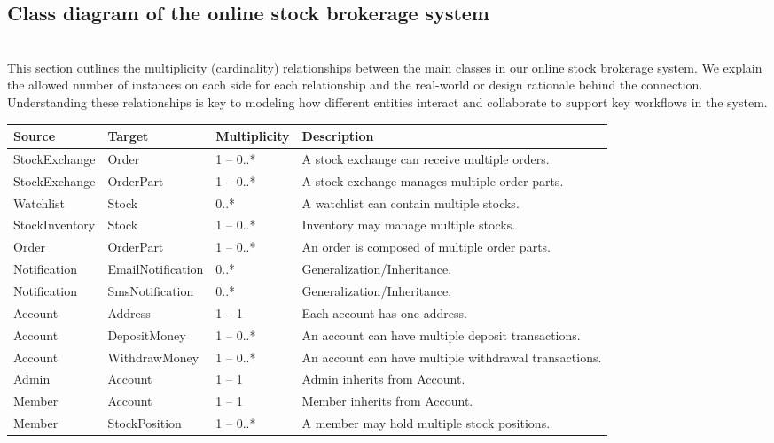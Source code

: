 \subsection{Class diagram of the online stock brokerage system}\label{bJQQQJ-QQApU6H2WxM6xd}
\\
This section outlines the multiplicity (cardinality) relationships between the main classes in our online stock brokerage system. We explain the allowed number of instances on each side for each relationship and the real-world or design rationale behind the connection. Understanding these relationships is key to modeling how different entities interact and collaborate to support key workflows in the system.

\begin{table}[h!]
\centering
\begin{tabularx}{\textwidth}{|X|X|X|X|}
\hline
\textbf{Source} & \textbf{Target} & \textbf{Multiplicity} & \textbf{Description} \\
\hline
StockExchange & Order & 1 – 0..* & A stock exchange can receive multiple orders. \\
\hline
StockExchange & OrderPart & 1 – 0..* & A stock exchange manages multiple order parts. \\
\hline
Watchlist & Stock & 0..* & A watchlist can contain multiple stocks. \\
\hline
StockInventory & Stock & 1 – 0..* & Inventory may manage multiple stocks. \\
\hline
Order & OrderPart & 1 – 0..* & An order is composed of multiple order parts. \\
\hline
Notification & EmailNotification & 0..* & Generalization/Inheritance. \\
\hline
Notification & SmsNotification & 0..* & Generalization/Inheritance. \\
\hline
Account & Address & 1 – 1 & Each account has one address. \\
\hline
Account & DepositMoney & 1 – 0..* & An account can have multiple deposit transactions. \\
\hline
Account & WithdrawMoney & 1 – 0..* & An account can have multiple withdrawal transactions. \\
\hline
Admin & Account & 1 – 1 & Admin inherits from Account. \\
\hline
Member & Account & 1 – 1 & Member inherits from Account. \\
\hline
Member & StockPosition & 1 – 0..* & A member may hold multiple stock positions. \\

\end{tabularx}
\end{table}
